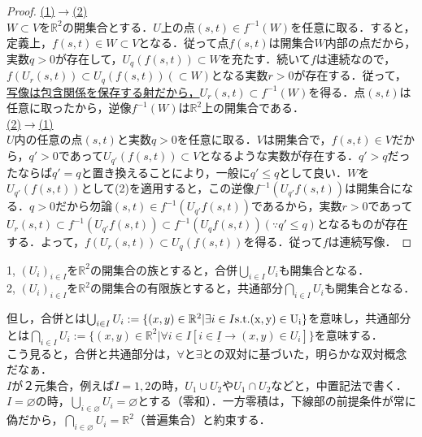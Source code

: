 \documentclass[uplatex, dvipdfmx]{jsreport}
\begin{document}
\begin{proof}
    \underline{(1)$\rightarrow$(2)}\\
    $W\subset V$を$\mathbb{R}^2$の開集合とする．$U$上の点$(s,t)\in f^{-1}(W)$を任意に取る．すると，定義上，$f(s,t)\in W\subset V$となる．従って点$f(s,t)$は開集合$W$内部の点だから，実数$q>0$が存在して，$U_q(f(s,t))\subset W$を充たす．続いて$f$は連続なので，$f(U_r(s,t))\subset U_q(f(s,t))(\subset W)$となる実数$r>0$が存在する．従って，\underline{写像は包含関係を保存する射だから，}$U_r(s,t)\subset f^{-1}(W)$を得る．点$(s,t)$は任意に取ったから，逆像$f^{-1}(W)$は$\mathbb{R}^2$上の開集合である．\\
    \underline{(2)$\rightarrow$(1)}\\
    $U$内の任意の点$(s,t)$と実数$q>0$を任意に取る．$V$は開集合で，$f(s,t)\in V$だから，$q'>0$であって$U_{q'}(f(s,t))\subset V$となるような実数が存在する．$q'>q$だったならば$q'=q$と置き換えることにより，一般に$q'\le q$として良い．$W$を$U_{q'}(f(s,t))$として(2)を適用すると，この逆像$f^{-1}(U_{q'}f(s,t))$は開集合になる．$q>0$だから勿論$(s,t)\in f^{-1}(U_{q'}f(s,t))$であるから，実数$r>0$であって$U_r(s,t)\subset f^{-1}(U_{q'}f(s,t)) \subset f^{-1}(U_{q}f(s,t)) (\because q'\le q)$となるものが存在する．よって，$f(U_r(s,t))\subset U_q(f(s,t))$を得る．従って$f$は連続写像．
\end{proof}

\begin{shadebox}\begin{proposition}[Euclid空間の開集合の集合演算に対する性質]\label{proposition1}
    1, $(U_i)_{i\in I}$を$\mathbb{R}^2$の開集合の族とすると，合併$\bigcup_{i\in I}U_i$も開集合となる．\\
    2, $(U_i)_{i\in I}$を$\mathbb{R}^2$の開集合の有限族とすると，共通部分$\bigcap_{i\in I}U_i$も開集合となる．\\
\end{proposition}\end{shadebox}

但し，合併とは$\bigcup_{i\in I}U_i := \{ (x,y)\in\mathbb{R}^2 | \exists i\in I \rm{s.t.} (x,y)\in U_i \}$を意味し，共通部分とは$\bigcap_{i\in I}U_i := \{ (x,y)\in\mathbb{R}^2 | \forall i\in I [\underline{i\in I \rightarrow} (x,y)\in U_i ]\}$を意味する．\\
こう見ると，合併と共通部分は，$\forall と \exists$との双対に基づいた，明らかな双対概念だなぁ．\\
$I$が２元集合，例えば$I={1,2}$の時，$U_1 \cup U_2$や$U_1 \cap U_2$などと，中置記法で書く．$I=\varnothing$の時，$\bigcup_{i\in\varnothing}U_i = \varnothing$とする（零和）．一方零積は，下線部の前提条件が常に偽だから，$\bigcap_{i\in\varnothing}U_i = \mathbb{R}^2$（普遍集合）と約束する．\\
\end{document}

